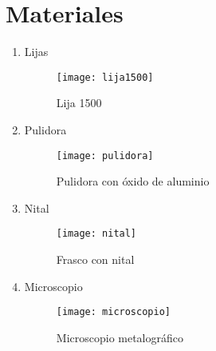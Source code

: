 \documentclass[a4paper,12pt]{report}
\begin{document}
\section{Materiales}
\begin{enumerate}
\item Lijas
\begin{figure}[H]
\begin{center}
\texttt{[image: lija1500]}
\end{center}
\caption{Lija 1500}
\end{figure}
\item Pulidora
\begin{figure}[H]
\begin{center}
\texttt{[image: pulidora]}
\end{center}
\caption{Pulidora con óxido de aluminio}
\end{figure}
\item Nital
\begin{figure}[H]
\begin{center}
\texttt{[image: nital]}
\end{center}
\caption{Frasco con nital}
\end{figure}
\item Microscopio
\begin{figure}[H]
\begin{center}
\texttt{[image: microscopio]}
\end{center}
\caption{Microscopio metalográfico}
\end{figure}
\end{enumerate}
\end{document}
